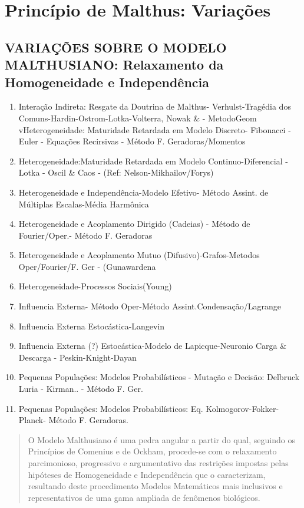 \chapter{Princípio de Malthus: Variações}
\addt

\section{VARIAÇÕES SOBRE O MODELO MALTHUSIANO: Relaxamento da Homogeneidade e Independência}


\begin{enumerate}
\item Interação Indireta: Resgate da Doutrina de Malthus- Verhulst-Tragédia dos Comuns-Hardin-Ostrom-Lotka-Volterra, Nowak \& - MetodoGeom
vHeterogeneidade: Maturidade Retardada em Modelo Discreto- Fibonacci - Euler - Equações Recirsivas - Método F. Geradoras/Momentos 
\item Heterogeneidade:Maturidade Retardada em Modelo Continuo-Diferencial - Lotka - Oscil \& Caos - (Ref: Nelson-Mikhailov/Forys) 
\item Heterogeneidade e Independência-Modelo Efetivo- Método Assint. de Múltiplas Escalas-Média Harmônica 
\item Heterogeneidade e Acoplamento Dirigido (Cadeias) - Método de Fourier/Oper.- Método F. Geradoras
\item Heterogeneidade e Acoplamento Mutuo (Difusivo)-Grafos-Metodos Oper/Fourier/F. Ger - (Gunawardena 
\item Heterogeneidade-Processos Sociais(Young) 
\item Influencia Externa- Método Oper-Método Assint.Condensação/Lagrange 
\item Influencia Externa Estocástica-Langevin
\item Influencia Externa (?) Estocástica-Modelo de Lapicque-Neuronio Carga \& Descarga - Peskin-Knight-Dayan 
\item Pequenas Populações: Modelos Probabilísticos - Mutação e Decisão: Delbruck Luria - Kirman.. - Método F. Ger.
\item Pequenas Populações: Modelos Probabilísticos: Eq. Kolmogorov-Fokker-Planck- Método F. Geradoras. 
\end{enumerate}

\begin{quotation}
    O Modelo Malthusiano é uma pedra angular a partir do qual, seguindo os Princípios de Comenius e de Ockham, procede-se com o relaxamento parcimonioso, progressivo e argumentativo das restrições impostas pelas hipóteses de Homogeneidade e Independência que o caracterizam, resultando deste procedimento Modelos Matemáticos mais inclusivos e representativos de uma gama ampliada de fenômenos biológicos.
\end{quotation}
 
